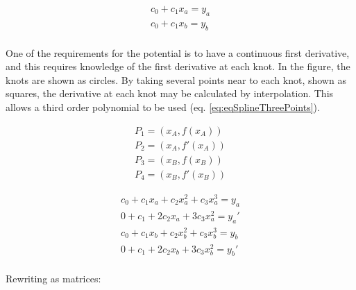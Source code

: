 \begin{equation}
\begin{split}
c_0 + c_1 x_a = y_a \\
c_0 + c_1 x_b = y_b \\
\end{split}
\label{eq:cubicSpline}
\end{equation}

One of the requirements for the potential is to have a continuous first derivative, and this requires knowledge of the first derivative at each knot.  In the figure, the knots are shown as circles.  By taking several points near to each knot, shown as squares, the derivative at each knot may be calculated by interpolation.  This allows a third order polynomial to be used (eq. \ref{eq:eqSplineThreePoints}).

\begin{equation}
\begin{split}
      P_{1} = \left( x_A, f(x_A) \right) \\
      P_{2} = \left( x_A, f'(x_A) \right) \\
      P_{3} = \left( x_B, f(x_B) \right) \\
      P_{4} = \left( x_B, f'(x_B) \right)
\end{split}
\label{eq:eqSplineThreePoints}
\end{equation}

\begin{equation}
\begin{split}
c_0 + c_1 x_a + c_2 x_a^2 + c_3 x_a^3 = y_a \\
0 + c_1 + 2 c_2 x_a + 3 c_3 x_a^2 = y_a' \\
c_0 + c_1 x_b + c_2 x_b^2 + c_3 x_b^3 = y_b \\
0 + c_1 + 2 c_2 x_b + 3 c_3 x_b^2 = y_b' \\
\end{split}
\label{eq:cubicSpline}
\end{equation}

Rewriting as matrices:

